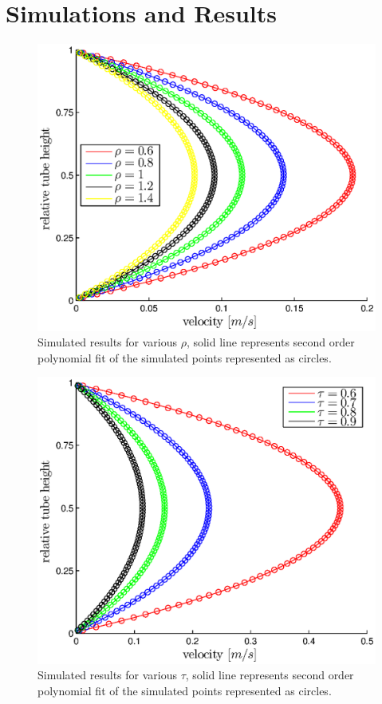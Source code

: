 \documentclass[8pt,twocolumn]{article}
\begin{document}
\section*{Simulations and Results}
\begin{figure}[!b]
\centering
\includegraphics[width=\linewidth]{images/rho.eps}
\caption{Simulated results for various $\rho$, solid line represents second order polynomial fit of the simulated points represented as circles.}
\label{fig:rho}
\end{figure}
\begin{figure}[!b]
\centering
\includegraphics[width=\linewidth]{images/tau.eps}
\caption{Simulated results for various $\tau$, solid line represents second order polynomial fit of the simulated points represented as circles.}
\label{fig:tau}
\end{figure}
\end{document}
